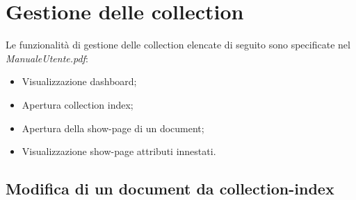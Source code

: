 \clearpage
\section{Gestione delle collection}
Le funzionalità di gestione delle collection elencate di seguito sono specificate nel \emph{ManualeUtente.pdf}:
	\begin{itemize}
		\item Visualizzazione dashboard;
		\item Apertura collection index;
		\item Apertura della show-page di un document;
		\item Visualizzazione show-page attributi innestati.
	\end{itemize}
	

	\subsection{Modifica di un document da collection-index} %
	\label{modificadocumentdacollectionindex}
